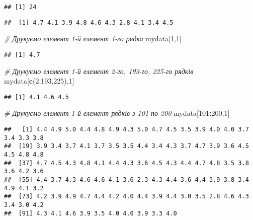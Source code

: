 \documentclass[
]{article}
\newenvironment{Shaded}{\begin{snugshade}}{\end{snugshade}}
\newcommand{\CommentTok}[1]{\textcolor[rgb]{0.56,0.35,0.01}{\textit{#1}}}
\newcommand{\DecValTok}[1]{\textcolor[rgb]{0.00,0.00,0.81}{#1}}
\newcommand{\KeywordTok}[1]{\textcolor[rgb]{0.13,0.29,0.53}{\textbf{#1}}}
\newcommand{\NormalTok}[1]{#1}
\newcommand{\OperatorTok}[1]{\textcolor[rgb]{0.81,0.36,0.00}{\textbf{#1}}}
\begin{document}
\begin{verbatim}
## [1] 24
\end{verbatim}

\begin{Shaded}
\end{Shaded}

\begin{verbatim}
##  [1] 4.7 4.1 3.9 4.8 4.6 4.3 2.8 4.1 3.4 4.5
\end{verbatim}

\begin{Shaded}
\begin{Highlighting}[]
\CommentTok{# Друкуємо елемент 1-й елемент 1-го рядка }
\NormalTok{mydata[}\DecValTok{1}\NormalTok{,}\DecValTok{1}\NormalTok{]}
\end{Highlighting}
\end{Shaded}

\begin{verbatim}
## [1] 4.7
\end{verbatim}

\begin{Shaded}
\begin{Highlighting}[]
\CommentTok{# Друкуємо елемент 1-й елемент 2-го, 193-го, 225-го рядків }
\NormalTok{mydata[}\KeywordTok{c}\NormalTok{(}\DecValTok{2}\NormalTok{,}\DecValTok{193}\NormalTok{,}\DecValTok{225}\NormalTok{),}\DecValTok{1}\NormalTok{]}
\end{Highlighting}
\end{Shaded}

\begin{verbatim}
## [1] 4.1 4.6 4.5
\end{verbatim}

\begin{Shaded}
\begin{Highlighting}[]
\CommentTok{# Друкуємо елемент 1-й елемент рядків з 101 по 200}
\NormalTok{mydata[}\DecValTok{101}\OperatorTok{:}\DecValTok{200}\NormalTok{,}\DecValTok{1}\NormalTok{]}
\end{Highlighting}
\end{Shaded}

\begin{verbatim}
##   [1] 4.4 4.9 5.0 4.4 4.8 4.9 4.3 5.0 4.7 4.5 3.5 3.9 4.0 4.0 3.7 3.4 3.3 3.8
##  [19] 3.9 3.4 3.7 4.1 3.7 3.5 3.5 4.4 3.4 4.3 3.7 4.7 3.9 3.6 4.5 4.5 4.8 4.8
##  [37] 4.7 4.5 4.3 4.8 4.1 4.4 4.3 3.6 4.5 4.3 4.4 4.7 4.8 3.5 3.8 3.6 4.2 3.6
##  [55] 4.4 3.7 4.3 4.6 4.6 4.1 3.6 2.3 4.3 4.4 3.6 4.4 3.9 3.8 3.4 4.9 4.1 3.2
##  [73] 4.2 3.9 4.9 4.7 4.4 4.2 4.0 4.4 3.9 4.4 3.0 3.5 2.8 4.6 4.3 3.4 3.0 4.2
##  [91] 4.3 4.1 4.6 3.9 3.5 4.0 4.0 3.9 3.3 4.0
\end{verbatim}
\end{document}

